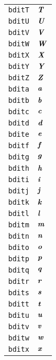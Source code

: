 \begin{longtable}{ll}
\texttt{bditT}&${}{\textbf{\textit{T}}}{}$\\
\texttt{bditU}&${}{\textbf{\textit{U}}}{}$\\
\texttt{bditV}&${}{\textbf{\textit{V}}}{}$\\
\texttt{bditW}&${}{\textbf{\textit{W}}}{}$\\
\texttt{bditX}&${}{\textbf{\textit{X}}}{}$\\
\texttt{bditY}&${}{\textbf{\textit{Y}}}{}$\\
\texttt{bditZ}&${}{\textbf{\textit{Z}}}{}$\\
\texttt{bdita}&${}{\textbf{\textit{a}}}{}$\\
\texttt{bditb}&${}{\textbf{\textit{b}}}{}$\\
\texttt{bditc}&${}{\textbf{\textit{c}}}{}$\\
\texttt{bditd}&${}{\textbf{\textit{d}}}{}$\\
\texttt{bdite}&${}{\textbf{\textit{e}}}{}$\\
\texttt{bditf}&${}{\textbf{\textit{f}}}{}$\\
\texttt{bditg}&${}{\textbf{\textit{g}}}{}$\\
\texttt{bdith}&${}{\textbf{\textit{h}}}{}$\\
\texttt{bditi}&${}{\textbf{\textit{i}}}{}$\\
\texttt{bditj}&${}{\textbf{\textit{j}}}{}$\\
\texttt{bditk}&${}{\textbf{\textit{k}}}{}$\\
\texttt{bditl}&${}{\textbf{\textit{l}}}{}$\\
\texttt{bditm}&${}{\textbf{\textit{m}}}{}$\\
\texttt{bditn}&${}{\textbf{\textit{n}}}{}$\\
\texttt{bdito}&${}{\textbf{\textit{o}}}{}$\\
\texttt{bditp}&${}{\textbf{\textit{p}}}{}$\\
\texttt{bditq}&${}{\textbf{\textit{q}}}{}$\\
\texttt{bditr}&${}{\textbf{\textit{r}}}{}$\\
\texttt{bdits}&${}{\textbf{\textit{s}}}{}$\\
\texttt{bditt}&${}{\textbf{\textit{t}}}{}$\\
\texttt{bditu}&${}{\textbf{\textit{u}}}{}$\\
\texttt{bditv}&${}{\textbf{\textit{v}}}{}$\\
\texttt{bditw}&${}{\textbf{\textit{w}}}{}$\\
\texttt{bditx}&${}{\textbf{\textit{x}}}{}$\\

\end{longtable}
